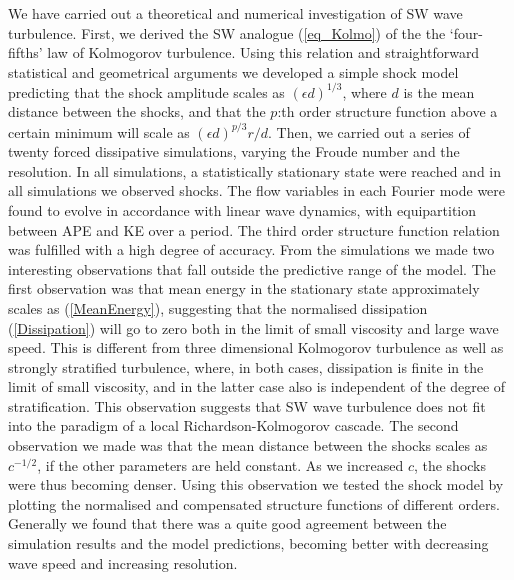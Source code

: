 \documentclass{jfm}
\begin{document}
We have carried out a theoretical and numerical investigation of SW wave turbulence. First, we derived the SW analogue (\ref{eq_Kolmo}) of the the `four-fifths' law of Kolmogorov turbulence. Using this relation and straightforward statistical and geometrical arguments we developed a simple shock model predicting that the shock amplitude scales as $ (\epsilon d)^{1/3} $, where $ d $ is the mean distance between the shocks, and that the $ p $:th order structure function above a certain minimum will scale as $ (\epsilon d)^{p/3} r/d $. Then, we carried out a series of twenty forced dissipative simulations, varying the Froude number and the resolution. In all simulations, a statistically stationary state were reached and in all simulations we observed shocks. The flow variables in each Fourier mode were found to evolve in accordance with linear wave dynamics, with equipartition between APE and KE over a period. The third order structure function relation was fulfilled with a high degree of accuracy. From the simulations we made two interesting observations that fall outside the predictive range of the model. The first observation  was  that mean energy in the stationary state approximately scales as (\ref{MeanEnergy}), suggesting that the normalised dissipation (\ref{Dissipation}) will go to zero both in the limit of small viscosity and large  wave speed. This is different from three dimensional Kolmogorov turbulence as well as strongly stratified turbulence, where, in both cases, dissipation is finite in the limit of small viscosity, and in the latter case also is independent of the degree of stratification. This observation suggests that SW wave turbulence does not fit into the paradigm of a local Richardson-Kolmogorov cascade. The second observation we made was that the mean distance between the shocks scales as $ c^{-1/2} $, if the other parameters are held constant. As we increased $ c $, the shocks were thus becoming denser. Using this observation we tested the shock model by plotting the normalised and compensated structure functions of different orders. Generally we found that there was a quite good agreement between the simulation results and the model predictions, becoming better with decreasing  wave speed and increasing resolution. 
\end{document}
